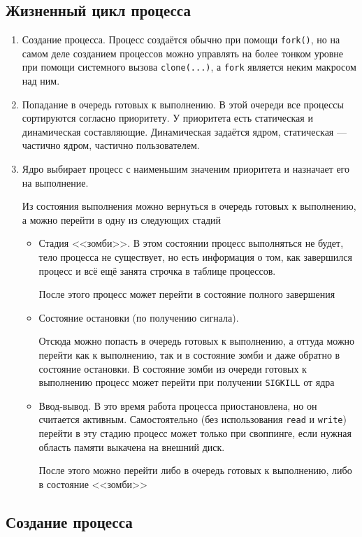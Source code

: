 \subsection{Жизненный цикл процесса}
\begin{enumerate}
\item Создание процесса. Процесс создаётся обычно при помощи \verb!fork()!, но на самом деле созданием процессов можно управлять на более тонком уровне при помощи системного вызова \verb!clone(...)!, а \verb!fork! является неким макросом над ним.
\item Попадание в очередь готовых к выполнению. В этой очереди все процессы сортируются согласно приоритету. У приоритета есть статическая и динамическая составляющие. Динамическая задаётся ядром, статическая --- частично ядром, частично пользователем.
\item Ядро выбирает процесс с наименьшим значеним приоритета и назначает его на выполнение.

 Из состояния выполнения можно вернуться в очередь готовых к выполнению, а можно перейти в одну из следующих стадий
\begin{itemize}
\item Стадия <<зомби>>. В этом состоянии процесс выполняться не будет, тело процесса не существует, но есть информация о том, как завершился процесс и всё ещё занята строчка в таблице процессов.

После этого процесс может перейти в состояние полного завершения
\item Состояние остановки (по получению сигнала). 

Отсюда можно попасть в очередь готовых к выполнению, а оттуда можно перейти как к выполнению, так и в состояние зомби и даже обратно в состояние остановки. В состояние зомби из очереди готовых к выполнению процесс может перейти при получении \verb!SIGKILL! от ядра

\item Ввод-вывод. В это время работа процесса приостановлена, но он считается активным. Самостоятельно (без использования \verb!read! и \verb!write!) перейти в эту стадию процесс может только при своппинге, если нужная область памяти выкачена на внешний диск. 

После этого можно перейти либо в очередь готовых к выполнению, либо в состояние <<зомби>>
\end{itemize}
\end{enumerate}

\subsection{Создание процесса}

